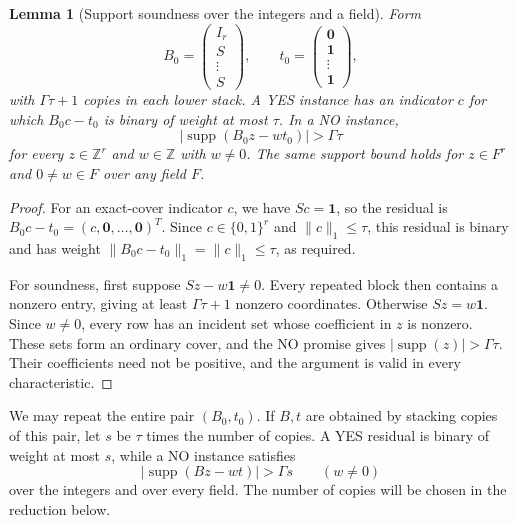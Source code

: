 \documentclass[11pt,letterpaper]{article}
\numberwithin{equation}{section}
\newtheorem{lemma}[theorem]{Lemma}
\theoremstyle{definition}
\theoremstyle{remark}
\DeclareMathOperator{\supp}{supp}
\newcommand{\Z}{\mathbb Z}
\begin{document}
\begin{lemma}[Support soundness over the integers and a field]\label{lem:cover}
Form
\begin{equation}\label{eq:cover-matrix}
 B_0=\begin{pmatrix}I_r\\ S\\ \vdots\\ S\end{pmatrix},
 \qquad t_0=\begin{pmatrix}\mathbf0\\ \mathbf1\\ \vdots\\ \mathbf1\end{pmatrix},
\end{equation}
with $\Gamma\tau+1$ copies in each lower stack. A YES instance has an indicator $c$ for which $B_0c-t_0$ is binary of weight at most $\tau$. In a NO instance,
\[
 |\supp(B_0z-wt_0)|>\Gamma\tau
\]
for every $z\in\Z^r$ and $w\in\Z$ with $w\ne0$. The same support bound holds for $z\in F^r$ and $0\ne w\in F$ over any field $F$.
\end{lemma}
\begin{proof}
For an exact-cover indicator $c$, we have $Sc=\mathbf1$, so the residual is $B_0c-t_0=(c,\mathbf0,\ldots,\mathbf0)^T$. Since $c\in\{0,1\}^r$ and $\|c\|_1\le\tau$, this residual is binary and has weight $\|B_0c-t_0\|_1=\|c\|_1\le\tau$, as required.

For soundness, first suppose $Sz-w\mathbf1\ne0$. Every repeated block then contains a nonzero entry, giving at least $\Gamma\tau+1$ nonzero coordinates. Otherwise $Sz=w\mathbf1$. Since $w\ne0$, every row has an incident set whose coefficient in $z$ is nonzero. These sets form an ordinary cover, and the NO promise gives $|\supp(z)|>\Gamma\tau$. Their coefficients need not be positive, and the argument is valid in every characteristic.
\end{proof}

We may repeat the entire pair $(B_0,t_0)$. If $B,t$ are obtained by stacking copies of this pair, let $s$ be $\tau$ times the number of copies. A YES residual is binary of weight at most $s$, while a NO instance satisfies
\begin{equation}\label{eq:cover-support}
 |\supp(Bz-wt)|>\Gamma s\qquad(w\ne0)
\end{equation}
over the integers and over every field. The number of copies will be chosen in the reduction below.
\end{document}
